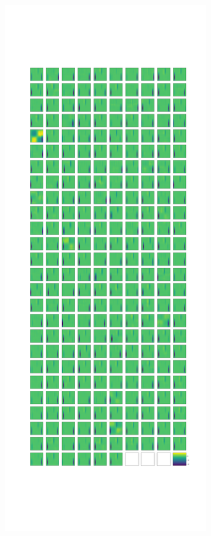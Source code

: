 \begin{figure}
\begin{subfigure}{0.45\textwidth}
        \includegraphics[width=\textwidth]{images/stripes/test_img_9/leaky_re_lu_5.png}

\end{subfigure}
\end{figure}
